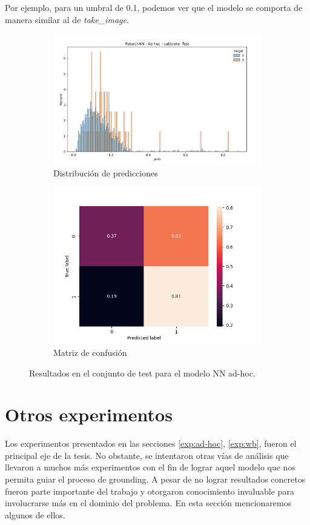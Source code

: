 Por ejemplo, para un umbral de 0.1, podemos ver que el modelo se comporta de
manera similar al de \emph{take\_image}.

\begin{figure}[h!]
    \begin{subfigure}[b]{\textwidth}
        \centering
        \includegraphics[width=0.7\linewidth]{figures/results/ad-hoc/nn/calibrate/nn_adhoc_calibrate_test.png}
        \caption{Distribución de predicciones}
        \label{fig:calibrate-bestmoodel-adhoc-test}
    \end{subfigure}
    \begin{subfigure}[b]{\textwidth}
        \centering
        \includegraphics[width=0.7\linewidth]{figures/results/ad-hoc/nn/calibrate/NN_cm_test.png}
        \caption{Matriz de confusión}
        \label{fig:calibrate-bestmoodel-adhoc-test}
    \end{subfigure}
    \caption{Resultados en el conjunto de test para el modelo NN ad-hoc.}
\end{figure}

\section{Otros experimentos}

Los experimentos presentados en las secciones \ref{exp:ad-hoc}, \ref{exp:wb},
fueron el principal eje de la tesis. No obstante, se intentaron otras vías de
análisis que llevaron a muchos más experimentos con el fin de lograr aquel
modelo que nos permita guiar el proceso de grounding. A pesar de no lograr
resultados concretos fueron parte importante del trabajo y otorgaron
conocimiento invaluable para involucrarse más en el dominio del problema.
En esta sección mencionaremos algunos de ellos.

